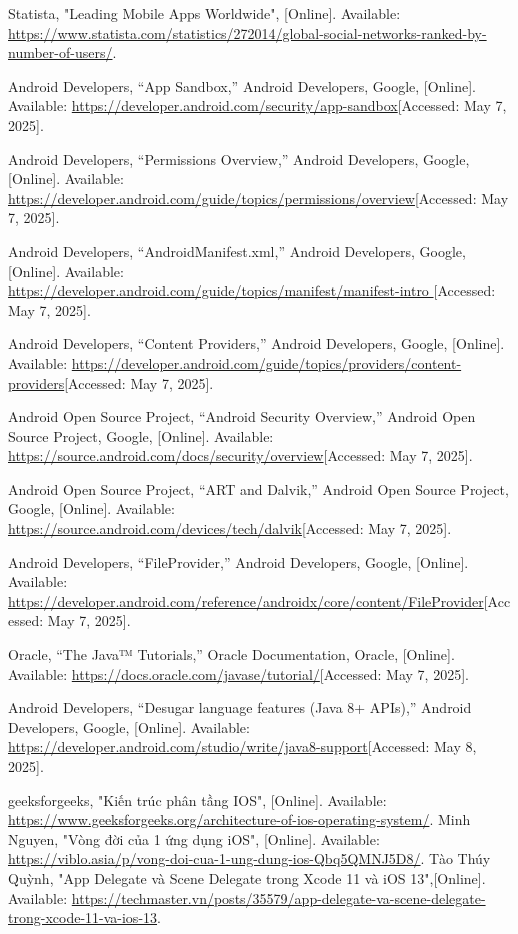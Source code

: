 \documentclass[12pt]{report}
\begin{document}
\begin{thebibliography}{1}
  Statista, "Leading Mobile Apps Worldwide", [Online]. Available: \url{https://www.statista.com/statistics/272014/global-social-networks-ranked-by-number-of-users/}.
  

  Android Developers, “App Sandbox,” Android Developers, Google, [Online]. Available: \url{https://developer.android.com/security/app-sandbox}[Accessed: May 7, 2025].
  
  Android Developers, “Permissions Overview,” Android Developers, Google, [Online]. Available: \url{https://developer.android.com/guide/topics/permissions/overview}[Accessed: May 7, 2025].
  
  Android Developers, “AndroidManifest.xml,” Android Developers, Google, [Online]. Available: \url{https://developer.android.com/guide/topics/manifest/manifest-intro }[Accessed: May 7, 2025].
   
  Android Developers, “Content Providers,” Android Developers, Google, [Online]. Available: \url{https://developer.android.com/guide/topics/providers/content-providers}[Accessed: May 7, 2025].
  
  Android Open Source Project, “Android Security Overview,” Android Open Source Project, Google, [Online]. Available: \url{https://source.android.com/docs/security/overview}[Accessed: May 7, 2025].
 
  Android Open Source Project, “ART and Dalvik,” Android Open Source Project, Google, [Online]. Available: \url{https://source.android.com/devices/tech/dalvik}[Accessed: May 7, 2025].
 
  Android Developers, “FileProvider,” Android Developers, Google, [Online]. Available: \url{https://developer.android.com/reference/androidx/core/content/FileProvider}[Accessed: May 7, 2025].
 
  Oracle, “The Java™ Tutorials,” Oracle Documentation, Oracle, [Online]. Available: \url{https://docs.oracle.com/javase/tutorial/}[Accessed: May 7, 2025].
 
  Android Developers, “Desugar language features (Java 8+ APIs),” Android Developers, Google, [Online]. Available: \url{https://developer.android.com/studio/write/java8-support}[Accessed: May 8, 2025].
 
  
 geeksforgeeks, "Kiến trúc phân tầng IOS", [Online]. Available: \url{https://www.geeksforgeeks.org/architecture-of-ios-operating-system/}.
  Minh Nguyen, "Vòng đời của 1 ứng dụng iOS", [Online]. Available: \url{https://viblo.asia/p/vong-doi-cua-1-ung-dung-ios-Qbq5QMNJ5D8/}.
Tào Thúy Quỳnh, "App Delegate và Scene Delegate trong Xcode 11 và iOS 13",[Online]. Available: \url{https://techmaster.vn/posts/35579/app-delegate-va-scene-delegate-trong-xcode-11-va-ios-13}.


\end{thebibliography}
\end{document}

